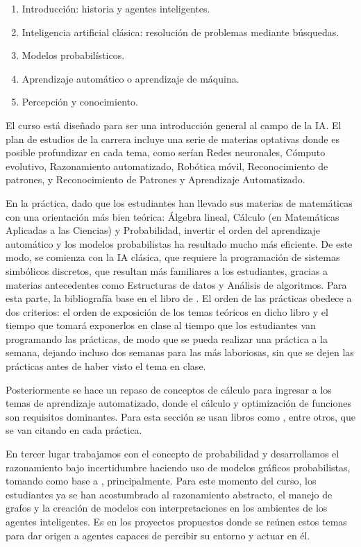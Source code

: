 \begin{enumerate}
 \item Introducción: historia y agentes inteligentes.
 \item Inteligencia artificial clásica: resolución de problemas mediante búsquedas.
 \item Modelos probabilísticos.
 \item Aprendizaje automático o aprendizaje de máquina.
 \item Percepción y conocimiento.
\end{enumerate}

El curso está diseñado para ser una introducción general al campo de la IA.  El plan de estudios de la carrera incluye una serie de materias optativas donde es posible profundizar en cada tema, como serían Redes neuronales, Cómputo evolutivo, Razonamiento automatizado, Robótica móvil, Reconocimiento de patrones, y Reconocimiento de Patrones y Aprendizaje Automatizado.

En la práctica, dado que los estudiantes han llevado sus materias de matemáticas con una orientación más bien teórica: Álgebra lineal, Cálculo (en Matemáticas Aplicadas a las Ciencias) y Probabilidad, invertir el orden del aprendizaje automático y los modelos probabilistas ha resultado mucho más eficiente.  De este modo, se comienza con la IA clásica, que requiere la programación de sistemas simbólicos discretos, que resultan más familiares a los estudiantes, gracias a materias antecedentes como Estructuras de datos y Análisis de algoritmos.  Para esta parte, la bibliografía base en el libro de \cite{StuartJRussell2022}.  El orden de las prácticas obedece a dos criterios: el orden de exposición de los temas teóricos en dicho libro y el tiempo que tomará exponerlos en clase al tiempo que los estudiantes van programando las prácticas, de modo que se pueda realizar una práctica a la semana, dejando incluso dos semanas para las más laboriosas, sin que se dejen las prácticas antes de haber visto el tema en clase.

Posteriormente se hace un repaso de conceptos de cálculo para ingresar a los temas de aprendizaje automatizado, donde el cálculo y optimización de funciones son requisitos dominantes.  Para esta sección se usan libros como \cite{Nengnevitsky2005, Mitchell1997}, entre otros, que se van citando en cada práctica.

En tercer lugar trabajamos con el concepto de probabilidad y desarrollamos el razonamiento bajo incertidumbre haciendo uso de modelos gráficos probabilistas, tomando como base a \cite{KollerFriedman2009}, principalmente.  Para este momento del curso, los estudiantes ya se han acostumbrado al razonamiento abstracto, el manejo de grafos y la creación de modelos con interpretaciones en los ambientes de los agentes inteligentes.  Es en los proyectos propuestos donde se reúnen estos temas para dar origen a agentes capaces de percibir su entorno y actuar en él.

